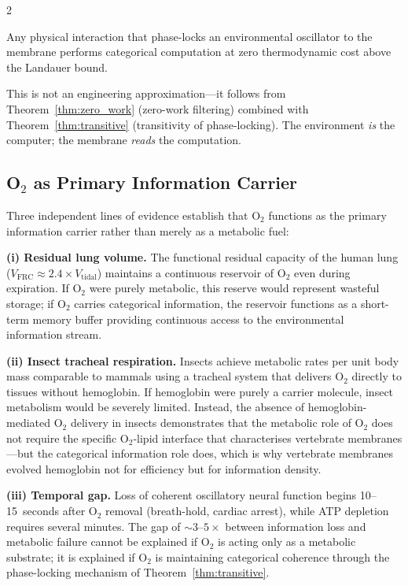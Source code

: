 \begin{multicols}{2}
\begin{corollary}
\label{cor:free_compute}
Any physical interaction that phase-locks an environmental oscillator to the membrane performs categorical computation at zero thermodynamic cost above the Landauer bound.
\end{corollary}

This is not an engineering approximation---it follows from Theorem~\ref{thm:zero_work} (zero-work filtering) combined with Theorem~\ref{thm:transitive} (transitivity of phase-locking). The environment \emph{is} the computer; the membrane \emph{reads} the computation.

\subsection{O$_2$ as Primary Information Carrier}

Three independent lines of evidence establish that O$_2$ functions as the primary information carrier rather than merely as a metabolic fuel:

\textbf{(i) Residual lung volume.}  The functional residual capacity of the human lung ($V_{\mathrm{FRC}} \approx 2.4 \times V_{\mathrm{tidal}}$) maintains a continuous reservoir of O$_2$ even during expiration. If O$_2$ were purely metabolic, this reserve would represent wasteful storage; if O$_2$ carries categorical information, the reservoir functions as a short-term memory buffer providing continuous access to the environmental information stream.

\textbf{(ii) Insect tracheal respiration.}  Insects achieve metabolic rates per unit body mass comparable to mammals using a tracheal system that delivers O$_2$ directly to tissues without hemoglobin. If hemoglobin were purely a carrier molecule, insect metabolism would be severely limited. Instead, the absence of hemoglobin-mediated O$_2$ delivery in insects demonstrates that the metabolic role of O$_2$ does not require the specific O$_2$-lipid interface that characterises vertebrate membranes---but the categorical information role does, which is why vertebrate membranes evolved hemoglobin not for efficiency but for information density.

\textbf{(iii) Temporal gap.}  Loss of coherent oscillatory neural function begins 10--15~seconds after O$_2$ removal (breath-hold, cardiac arrest), while ATP depletion requires several minutes. The gap of $\sim 3$--$5\times$ between information loss and metabolic failure cannot be explained if O$_2$ is acting only as a metabolic substrate; it is explained if O$_2$ is maintaining categorical coherence through the phase-locking mechanism of Theorem~\ref{thm:transitive}.


\end{multicols}
